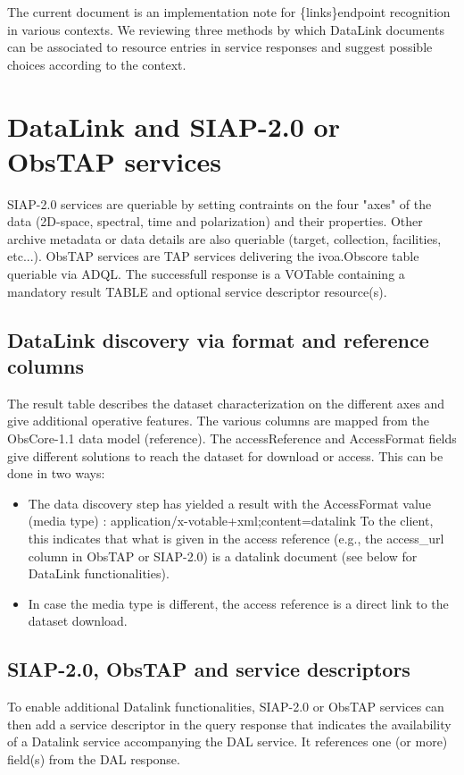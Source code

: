 \documentclass[11pt,a4paper]{ivoa}
\newcommand{\blinks}{\{links\}}
\begin{document}
The  current document  is an implementation note for \blinks endpoint recognition in various contexts.
We reviewing three methods by which DataLink documents can be associated to  resource entries in service responses and suggest possible choices according to the context. 

\section{DataLink and SIAP-2.0 or ObsTAP services}

SIAP-2.0 \citep{2015ivoa.spec.1223D} services  are queriable by setting contraints on the four "axes" of the data (2D-space, spectral, time and polarization) and their properties. Other archive metadata or data details are also queriable  (target, collection, facilities, etc...). ObsTAP services are TAP services delivering the ivoa.Obscore table queriable via ADQL. The successfull response is a VOTable containing a mandatory  result TABLE and optional service descriptor resource(s).

\subsection{DataLink discovery via format and reference columns}
The result table describes the dataset characterization on the different axes and give additional operative features. The various columns are mapped from the ObsCore-1.1 data model (reference). The accessReference and AccessFormat fields give different solutions to reach the dataset for download or access.  This can be done in two ways: 
\begin{itemize}
\item The data discovery step has yielded a result with the AccessFormat value (media type) : application/x-votable+xml;content=datalink
 To the client, this indicates that what is given in the access reference (e.g., the access\_url column in ObsTAP or SIAP-2.0)  is a datalink document (see below for DataLink functionalities). 
\item In case the media type is different, the access reference is a direct link to the dataset download. 
\end{itemize}

\subsection{SIAP-2.0, ObsTAP and service descriptors}
To  enable additional Datalink functionalities, SIAP-2.0 or ObsTAP services can then add a service descriptor in the query response that indicates the availability of a Datalink service accompanying the DAL service.  It references one (or more) field(s) from the DAL response.
\end{document}
